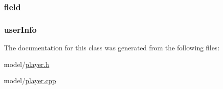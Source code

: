 \subsubsection[{\texorpdfstring{field}{field}}]{ field\hspace{0.3cm}{\ttfamily [private]}}\hypertarget{classMODEL_1_1Player_a81b1c66a79769f4de04990e7973e1f17}{}\label{classMODEL_1_1Player_a81b1c66a79769f4de04990e7973e1f17}
\subsubsection[{\texorpdfstring{user\+Info}{userInfo}}]{ user\+Info\hspace{0.3cm}{\ttfamily [private]}}\hypertarget{classMODEL_1_1Player_a4ea833995f730252c0bbafea4cf0fdc2}{}\label{classMODEL_1_1Player_a4ea833995f730252c0bbafea4cf0fdc2}


The documentation for this class was generated from the following files\+:\begin{DoxyCompactItemize}
\item 
model/\hyperlink{model_2player_8h}{player.\+h}\item 
model/\hyperlink{model_2player_8cpp}{player.\+cpp}\end{DoxyCompactItemize}
